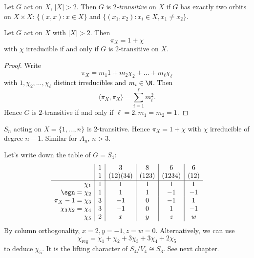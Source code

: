 \documentclass[a4paper]{article}
\theoremstyle{definition}
\begin{document}
\begin{definition}[\(2\)-transitive]
  Let \(G\) act on \(X\), \(|X| > 2\). Then \(G\) is \emph{\(2\)-transitive} on \(X\) if \(G\) has exactly two orbits on \(X \times X\): \(\{(x, x): x \in X\}\) and \(\{(x_1, x_2): x_i \in X, x_1 \neq x_2\}\).
\end{definition}

\begin{lemma}
  Let \(G\) act on \(X\) with \(|X| > 2\). Then
  \[
    \pi_X = 1 + \chi
  \]
  with \(\chi\) irreducible if and only if \(G\) is \(2\)-transitive on \(X\).
\end{lemma}

\begin{proof}
  Write
  \[
    \pi_X = m_1 1 + m_2 \chi_2 + \dots + m_\ell \chi_\ell
  \]
  with \(1, \chi_2, \dots, \chi_\ell\) distinct irreducibles and \(m_i \in \N\). Then
  \[
    \langle \pi_X, \pi_X \rangle = \sum_{i = 1}^\ell m_i^2.
  \]
  Hence \(G\) is \(2\)-transitive if and only if \(\ell = 2, m_1 = m_2 = 1\).
\end{proof}

\begin{eg}
  \(S_n\) acting on \(X = \{1, \dots, n\}\) is \(2\)-transitive. Hence \(\pi_X = 1 + \chi\) with \(\chi\) irreducible of degree \(n - 1\). Similar for \(A_n\), \(n > 3\).
\end{eg}

\begin{eg}
  Let's write down the table of \(G = S_4\):
  \[
    \begin{array}{r|c|c|c|c|c}
      & 1 & 3 & 8 & 6 & 6 \\
      & 1 & (12)(34) & (123) & (1234) & (12) \\ \hline
      \chi_1 & 1 & 1 & 1 & 1 & 1 \\
      \sgn = \chi_2 & 1 & 1 & 1 & -1 & -1  \\
      \pi_X - 1 = \chi_3 & 3 & -1 & 0 & -1 & 1 \\
      \chi_3 \chi_2 = \chi_4 & 3 & -1 & 0 & 1 & -1 \\
      \chi_5 & 2 & x & y & z & w
    \end{array}
  \]
  By column orthogonality, \(x = 2, y = -1, z = w = 0\). Alternatively, we can use
  \[
    \chi_{\text{reg}} = \chi_1 + \chi_2 + 3 \chi_3 + 3 \chi_4 + 2 \chi_5
  \]
  to deduce \(\chi_5\). It is the lifting character of \(S_4/V_4 \cong S_3\). See next chapter.
\end{eg}
\end{document}
